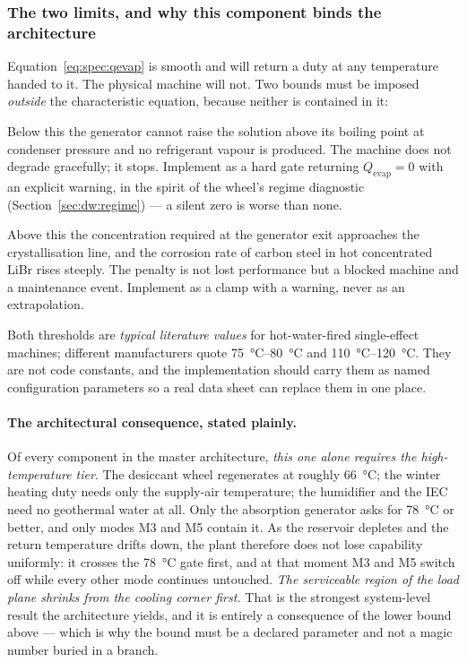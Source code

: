 \documentclass[11pt]{article}
\providecommand{\celsius}{\degreeCelsius}
\begin{document}
\subsubsection{The two limits, and why this component binds the architecture}
Equation~\eqref{eq:spec:qevap} is smooth and will return a duty at any temperature handed to it. The
physical machine will not. Two bounds must be imposed \emph{outside} the characteristic equation,
because neither is contained in it:
\begin{description}[leftmargin=1.6em,nosep]
\item[Lower bound, $T_{\mathrm{gen}}\gtrsim\SI{78}{\celsius}$.] Below this the generator cannot raise
the solution above its boiling point at condenser pressure and no refrigerant vapour is produced. The
machine does not degrade gracefully; it stops. Implement as a hard gate returning
$Q_{\mathrm{evap}}=0$ with an explicit warning, in the spirit of the wheel's regime diagnostic
(Section~\ref{sec:dw:regime}) --- a silent zero is worse than none.
\item[Upper bound, $T_{\mathrm{gen}}\lesssim\SI{110}{\celsius}$.] Above this the concentration
required at the generator exit approaches the crystallisation line, and the corrosion rate of carbon
steel in hot concentrated LiBr rises steeply. The penalty is not lost performance but a blocked
machine and a maintenance event. Implement as a clamp with a warning, never as an extrapolation.
\end{description}
Both thresholds are \emph{typical literature values} for hot-water-fired single-effect machines;
different manufacturers quote \SIrange{75}{80}{\celsius} and \SIrange{110}{120}{\celsius}. They are
not code constants, and the implementation should carry them as named configuration parameters so a
real data sheet can replace them in one place.

\paragraph{The architectural consequence, stated plainly.} Of every component in the master
architecture, \emph{this one alone requires the high-temperature tier}. The desiccant wheel
regenerates at roughly \SI{66}{\celsius}; the winter heating duty needs only the supply-air
temperature; the humidifier and the IEC need no geothermal water at all. Only the absorption
generator asks for \SI{78}{\celsius} or better, and only modes M3 and M5 contain it. As the reservoir
depletes and the return temperature drifts down, the plant therefore does not lose capability
uniformly: it crosses the \SI{78}{\celsius} gate first, and at that moment M3 and M5 switch off while
every other mode continues untouched. \emph{The serviceable region of the load plane shrinks from the
cooling corner first.} That is the strongest system-level result the architecture yields, and it is
entirely a consequence of the lower bound above --- which is why the bound must be a declared
parameter and not a magic number buried in a branch.
\end{document}
